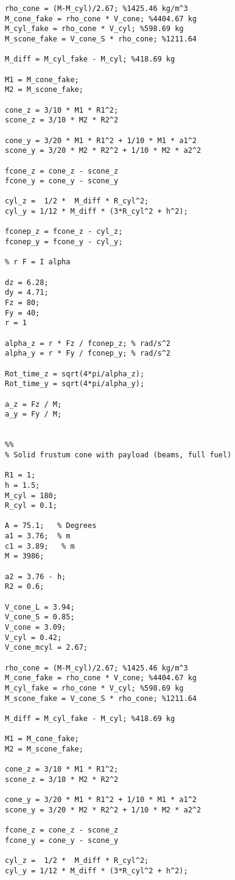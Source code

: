 \begin{lstlisting}
rho_cone = (M-M_cyl)/2.67; %1425.46 kg/m^3
M_cone_fake = rho_cone * V_cone; %4404.67 kg
M_cyl_fake = rho_cone * V_cyl; %598.69 kg
M_scone_fake = V_cone_S * rho_cone; %1211.64

M_diff = M_cyl_fake - M_cyl; %418.69 kg

M1 = M_cone_fake;
M2 = M_scone_fake;

cone_z = 3/10 * M1 * R1^2;
scone_z = 3/10 * M2 * R2^2

cone_y = 3/20 * M1 * R1^2 + 1/10 * M1 * a1^2
scone_y = 3/20 * M2 * R2^2 + 1/10 * M2 * a2^2

fcone_z = cone_z - scone_z
fcone_y = cone_y - scone_y

cyl_z =  1/2 *  M_diff * R_cyl^2;
cyl_y = 1/12 * M_diff * (3*R_cyl^2 + h^2);

fconep_z = fcone_z - cyl_z;
fconep_y = fcone_y - cyl_y;

% r F = I alpha

dz = 6.28;
dy = 4.71;
Fz = 80;
Fy = 40;
r = 1

alpha_z = r * Fz / fconep_z; % rad/s^2
alpha_y = r * Fy / fconep_y; % rad/s^2

Rot_time_z = sqrt(4*pi/alpha_z);
Rot_time_y = sqrt(4*pi/alpha_y);

a_z = Fz / M;
a_y = Fy / M;


%%
% Solid frustum cone with payload (beams, full fuel)

R1 = 1;
h = 1.5;
M_cyl = 180;
R_cyl = 0.1;

A = 75.1;   % Degrees
a1 = 3.76;  % m
c1 = 3.89;   % m
M = 3986;

a2 = 3.76 - h;
R2 = 0.6;

V_cone_L = 3.94; 
V_cone_S = 0.85;
V_cone = 3.09;
V_cyl = 0.42;
V_cone_mcyl = 2.67;

rho_cone = (M-M_cyl)/2.67; %1425.46 kg/m^3
M_cone_fake = rho_cone * V_cone; %4404.67 kg
M_cyl_fake = rho_cone * V_cyl; %598.69 kg
M_scone_fake = V_cone_S * rho_cone; %1211.64

M_diff = M_cyl_fake - M_cyl; %418.69 kg

M1 = M_cone_fake;
M2 = M_scone_fake;

cone_z = 3/10 * M1 * R1^2;
scone_z = 3/10 * M2 * R2^2

cone_y = 3/20 * M1 * R1^2 + 1/10 * M1 * a1^2
scone_y = 3/20 * M2 * R2^2 + 1/10 * M2 * a2^2

fcone_z = cone_z - scone_z
fcone_y = cone_y - scone_y

cyl_z =  1/2 *  M_diff * R_cyl^2;
cyl_y = 1/12 * M_diff * (3*R_cyl^2 + h^2);


\end{lstlisting}
